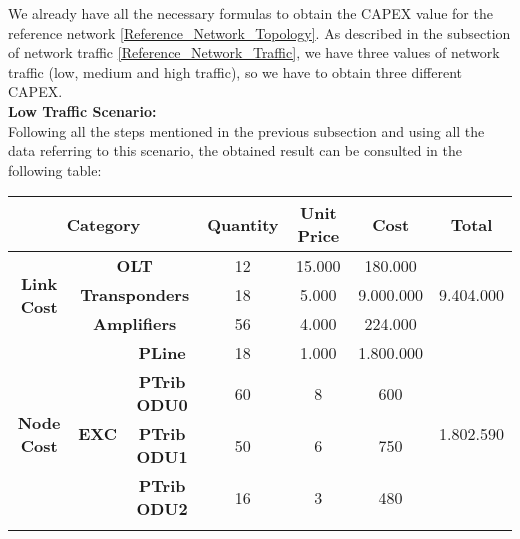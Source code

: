 We already have all the necessary formulas to obtain the CAPEX value for the reference network \ref{Reference_Network_Topology}. As described in the subsection of network traffic \ref{Reference_Network_Traffic}, we have three values of network traffic (low, medium and high traffic), so we have to obtain three different CAPEX.\\

\textbf{Low Traffic Scenario:}\\

Following all the steps mentioned in the previous subsection and using all the data referring to this scenario, the obtained result can be consulted in the following table:

\begin{table}[H]
\centering
\label{opaque_low_traffic}
\begin{tabular}{|c|c|c|c|c|c|c|}
\hline
\multicolumn{3}{|c|}{\textbf{Category}}                                                   & \textbf{Quantity} & \textbf{Unit Price} & \textbf{Cost} & \textbf{Total}             \\ \hline
\multirow{3}{*}{\textbf{Link Cost}} & \multicolumn{2}{c|}{\textbf{OLT}}                   & 12                & 15.000              & 180.000       & \multirow{3}{*}{9.404.000} \\ \cline{2-6}
                                    & \multicolumn{2}{c|}{\textbf{Transponders}}          & 18                & 5.000               & 9.000.000     &                            \\ \cline{2-6}
                                    & \multicolumn{2}{c|}{\textbf{Amplifiers}}            & 56                & 4.000               & 224.000       &                            \\ \hline
\multirow{8}{*}{\textbf{Node Cost}} & \multirow{6}{*}{\textbf{EXC}} & \textbf{PLine}      & 18                & 1.000                & 1.800.000     & \multirow{8}{*}{1.802.590} \\ \cline{3-6}
                                    &                               & \textbf{PTrib ODU0} & 60                & 8                   & 600           &                            \\ \cline{3-6}
                                    &                               & \textbf{PTrib ODU1} & 50                & 6                   & 750           &                            \\ \cline{3-6}
                                    &                               & \textbf{PTrib ODU2} & 16                & 3                   & 480           &                            \\ \cline{3-6}

\end{tabular}
\end{table}
